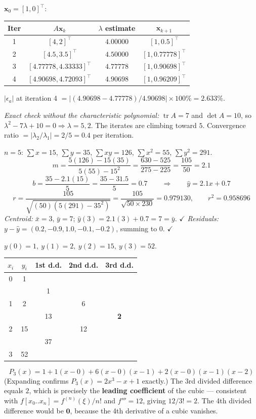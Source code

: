 \begin{probbox}
 $\mathbf x_0 = [1,0]^\top$:
\begin{center}\small
\begin{tabular}{@{}cccc@{}}
\toprule
Iter & $A\mathbf x_k$ & $\lambda$ estimate & $\mathbf x_{k+1}$\\
\midrule
1 & $[4, 2]^\top$ & $4.00000$ & $[1, 0.5]^\top$\\
2 & $[4.5, 3.5]^\top$ & $4.50000$ & $[1, 0.77778]^\top$\\
3 & $[4.77778, 4.33333]^\top$ & $4.77778$ & $[1, 0.90698]^\top$\\
4 & $[4.90698, 4.72093]^\top$ & $4.90698$ & $[1, 0.96209]^\top$\\
\bottomrule
\end{tabular}
\end{center}
$|\epsilon_a|$ at iteration 4 $= |(4.90698-4.77778)/4.90698|\times100\% = 2.633\%$.

\emph{Exact check without the characteristic polynomial:} $\operatorname{tr}A = 7$ and $\det A = 10$, so $\lambda^2-7\lambda+10=0 \Rightarrow \lambda = 5, 2$. The iterates are climbing toward $5$. Convergence ratio $= |\lambda_2/\lambda_1| = 2/5 = 0.4$ per iteration.

 $n=5$: $\sum x = 15$, $\sum y = 35$, $\sum xy = 126$, $\sum x^2 = 55$, $\sum y^2 = 291$.
\[
m = \frac{5(126)-15(35)}{5(55)-15^2} = \frac{630-525}{275-225} = \frac{105}{50} = 2.1
\]
\[
b = \frac{35-2.1(15)}{5} = \frac{35-31.5}{5} = 0.7 \qquad\Rightarrow\qquad \hat y = 2.1x+0.7
\]
\[
r = \frac{105}{\sqrt{(50)(5(291)-35^2)}} = \frac{105}{\sqrt{50 \times 230}} = 0.979130, \qquad r^2 = 0.958696
\]
\emph{Centroid:} $\bar x = 3$, $\bar y = 7$; $\hat y(3) = 2.1(3)+0.7 = 7 = \bar y$. $\checkmark$
\emph{Residuals:} $y - \hat y = (0.2, -0.9, 1.0, -0.1, -0.2)$, summing to $0$. $\checkmark$

 $y(0)=1,\ y(1)=2,\ y(2)=15,\ y(3)=52$.
\begin{center}\small
\begin{tabular}{@{}ccccc@{}}
\toprule
$x_i$ & $y_i$ & 1st d.d. & 2nd d.d. & 3rd d.d.\\
\midrule
0 & 1 & & & \\
  &   & 1 & & \\
1 & 2 & & 6 & \\
  &   & 13 & & \textbf{2}\\
2 & 15 & & 12 & \\
  &   & 37 & & \\
3 & 52 & & & \\
\bottomrule
\end{tabular}
\end{center}
\[
P_3(x) = 1 + 1(x-0) + 6(x-0)(x-1) + 2(x-0)(x-1)(x-2)
\]
(Expanding confirms $P_3(x) = 2x^3 - x + 1$ exactly.) The 3rd divided difference equals $2$, which is precisely the \textbf{leading coefficient} of the cubic --- consistent with $f[x_0..x_n] = f^{(n)}(\xi)/n!$ and $f'''=12$, giving $12/3! = 2$. The 4th divided difference would be $\mathbf{0}$, because the 4th derivative of a cubic vanishes.


\end{probbox}
